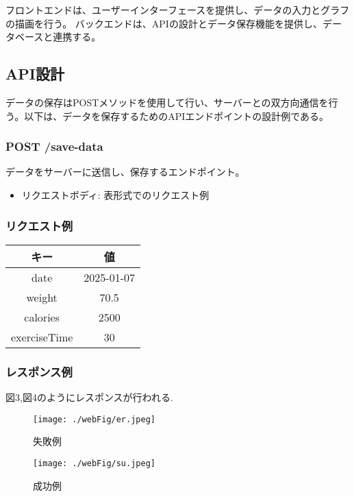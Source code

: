 \documentclass[uplatex,dvipdfmx]{jsarticle}
\begin{document}
フロントエンドは、ユーザーインターフェースを提供し、データの入力とグラフの描画を行う。
バックエンドは、APIの設計とデータ保存機能を提供し、データベースと連携する。

\subsection{API設計}
データの保存はPOSTメソッドを使用して行い、サーバーとの双方向通信を行う。以下は、データを保存するためのAPIエンドポイントの設計例である。

\subsubsection{POST /save-data}
データをサーバーに送信し、保存するエンドポイント。
\begin{itemize}
    \item リクエストボディ: 表形式でのリクエスト例
\end{itemize}

\subsubsection{リクエスト例}

\begin{tabular}{|c|c|}
\hline
キー & 値 \\
\hline
date & 2025-01-07 \\
weight & 70.5 \\
calories & 2500 \\
exerciseTime & 30 \\
\hline
\end{tabular}

\subsubsection{レスポンス例}
図3,図4のようにレスポンスが行われる.

\begin{figure}[H]
    \centering
    \begin{minipage}{0.45\textwidth}  %
        \centering
        \texttt{[image: ./webFig/er.jpeg]}
        \caption{失敗例}
        \label{fig:left_image}
    \end{minipage}
    \hspace{0.05\textwidth}  %
    \begin{minipage}{0.45\textwidth}  %
        \centering
        \texttt{[image: ./webFig/su.jpeg]}
        \caption{成功例}
        \label{fig:right_image}
    \end{minipage}
\end{figure}
\end{document}
